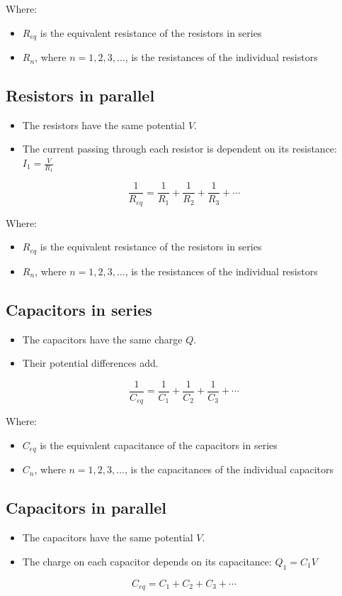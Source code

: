 \documentclass[11pt]{article}
\begin{document}
Where:
\begin{itemize}
\item \(R_{eq}\) is the equivalent resistance of the resistors in series
\item \(R_n\), where \(n = 1, 2, 3, \ldots\), is the resistances of the individual resistors
\end{itemize}

\subsection{Resistors in parallel}
\label{sec:org2082456}
\begin{itemize}
\item The resistors have the same potential \(V\).
\item The current passing through each resistor is dependent on its resistance: \(I_1 = \frac{V}{R_1}\)
\end{itemize}
\[\frac{1}{R_{eq}} = \frac{1}{R_1} + \frac{1}{R_2} + \frac{1}{R_3} + \cdots\]

Where:
\begin{itemize}
\item \(R_{eq}\) is the equivalent resistance of the resistors in series
\item \(R_n\), where \(n = 1, 2, 3, \ldots\), is the resistances of the individual resistors
\end{itemize}

\subsection{Capacitors in series}
\label{sec:org60f4e7c}
\begin{itemize}
\item The capacitors have the same charge \(Q\).
\item Their potential differences add.
\end{itemize}

\[\frac{1}{C_{eq}} = \frac{1}{C_1} + \frac{1}{C_2} + \frac{1}{C_3} + \cdots\]

Where:
\begin{itemize}
\item \(C_{eq}\) is the equivalent capacitance of the capacitors in series
\item \(C_n\), where \(n = 1, 2, 3, \ldots\), is the capacitances of the individual capacitors
\end{itemize}

\subsection{Capacitors in parallel}
\label{sec:orgc77ad3f}
\begin{itemize}
\item The capacitors have the same potential \(V\).
\item The charge on each capacitor depends on its capacitance: \(Q_1 = C_1 V\)
\end{itemize}
\[C_{eq} = C_1 + C_2 + C_3 + \cdots\]
\end{document}

